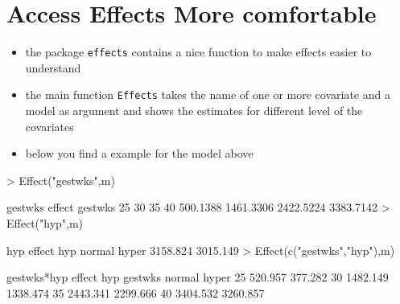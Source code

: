 \documentclass[11pt]{article}
\begin{document}
\section{Access Effects More comfortable}
\begin{itemize}
\item the package \texttt{effects} contains a nice function to make effects easier to understand
\item the main function \texttt{Effects} takes the name of one or more covariate and a model as argument and shows the estimates for different level of the covariates
\item below you find a example for the model above
\end{itemize}
> Effect("gestwks",m)

 gestwks effect
gestwks
       25        30        35        40 
 500.1388 1461.3306 2422.5224 3383.7142 
> Effect("hyp",m)

 hyp effect
hyp
  normal    hyper 
3158.824 3015.149 
> Effect(c("gestwks","hyp"),m)

 gestwks*hyp effect
       hyp
gestwks   normal    hyper
     25  520.957  377.282
     30 1482.149 1338.474
     35 2443.341 2299.666
     40 3404.532 3260.857
\begin{verbatim}
  
\end{verbatim}
\end{document}
